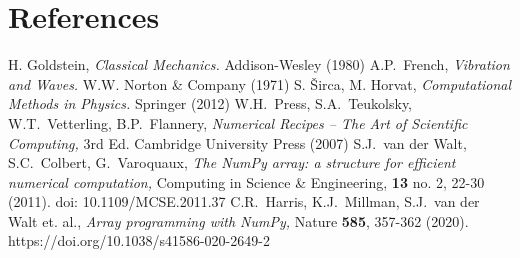 \documentclass{iopart}
\begin{document}
\section*{References}
\begin{thebibliography}{99}
   H. Goldstein, \textsl{Classical Mechanics.} Addison-Wesley
  (1980)
%
   A.P.~French, \textsl{Vibration and Waves.} W.W. Norton \&
  Company (1971)
%
   S. \v{S}irca, M. Horvat, \textsl{Computational Methods in
  Physics.} Springer (2012)
%
   W.H.~Press, S.A.~Teukolsky, W.T.~Vetterling, B.P.~Flannery,
  \textsl{Numerical Recipes -- The Art of Scientific Computing,} 3rd Ed.
  Cambridge University Press (2007)
%
   S.J.~van der Walt, S.C.~Colbert, G.~Varoquaux,
  \textsl{The NumPy array: a structure for efficient numerical computation,}
  Computing in Science \& Engineering, \textbf{13} no. 2, 22-30 (2011).
  doi: 10.1109/MCSE.2011.37
%
   C.R.~Harris, K.J.~Millman, S.J.~van der Walt et. al.,
  \textsl{Array programming with NumPy,} Nature \textbf{585}, 357-362 (2020).
  https://doi.org/10.1038/s41586-020-2649-2
\end{thebibliography}
\end{document}

